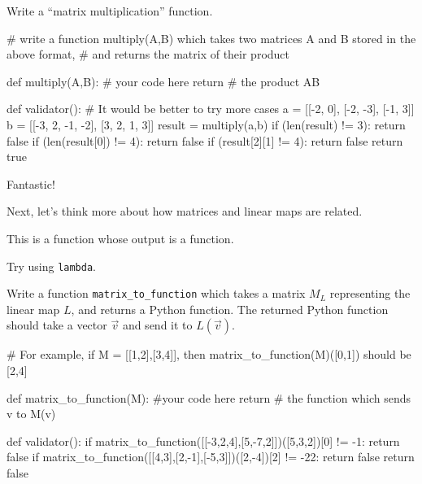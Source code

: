 \documentclass{ximera}
\begin{document}
\begin{exercise}
Write a ``matrix multiplication'' function.

\begin{solution}
\begin{python}
# write a function multiply(A,B) which takes two matrices A and B stored in the above format,
# and returns the matrix of their product
		
def multiply(A,B):
  # your code here
  return # the product AB

def validator():
  # It would be better to try more cases
  a = [[-2, 0], [-2, -3], [-1, 3]]
  b = [[-3, 2, -1, -2], [3, 2, 1, 3]]
  result = multiply(a,b)
  if (len(result) != 3):
    return false
  if (len(result[0]) != 4):
    return false
  if (result[2][1] != 4):
    return false
  return true
\end{python}
\end{solution}

Fantastic!

Next, let's think more about how matrices and linear maps are related.

\begin{solution}
  \begin{hint}
  \begin{warning}
    This is a function whose output is a function.
  \end{warning}
  \end{hint}

  \begin{hint}
    Try using \verb|lambda|.
  \end{hint}

  Write a function \verb|matrix_to_function| which takes a matrix
  $M_L$ representing the linear map $L$, and returns a Python
  function.  The returned Python function should take a vector
  $\vec{v}$ and send it to $L(\vec{v})$.

\begin{python}
# For example, if M = [[1,2],[3,4]], then matrix_to_function(M)([0,1]) should be [2,4]

def matrix_to_function(M):
  #your code here
  return # the function which sends v to M(v)

def validator():
  if matrix_to_function([[-3,2,4],[5,-7,2]])([5,3,2])[0] != -1:
    return false
  if matrix_to_function([[4,3],[2,-1],[-5,3]])([2,-4])[2] != -22:
    return false
  return false
\end{python}
\end{solution}


\end{exercise}
\end{document}
